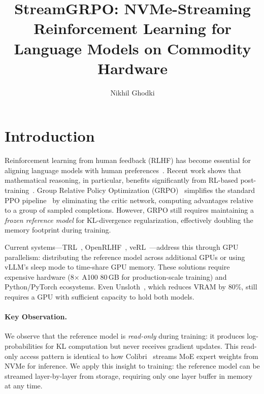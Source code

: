 \documentclass[sigconf,review,anonymous]{acmart}
\title{StreamGRPO: NVMe-Streaming Reinforcement Learning for Language Models on Commodity Hardware}
\author{Nikhil Ghodki}
\affiliation{%
  \institution{Cisco Systems}
  \city{San Jose}
  \state{CA}
  \country{USA}
}
\begin{document}
\maketitle

\section{Introduction}

Reinforcement learning from human feedback (RLHF) has become essential for aligning language models with human preferences~\cite{ouyang2022instructgpt}. Recent work shows that mathematical reasoning, in particular, benefits significantly from RL-based post-training~\cite{shao2024deepseekmath,guo2025deepseekr1}. Group Relative Policy Optimization (GRPO)~\cite{shao2024deepseekmath} simplifies the standard PPO pipeline~\cite{schulman2017ppo} by eliminating the critic network, computing advantages relative to a group of sampled completions. However, GRPO still requires maintaining a \emph{frozen reference model} for KL-divergence regularization, effectively doubling the memory footprint during training.

Current systems---TRL~\cite{trl2024}, OpenRLHF~\cite{hu2024openrlhf}, veRL~\cite{verl2025}---address this through GPU parallelism: distributing the reference model across additional GPUs or using vLLM's sleep mode to time-share GPU memory. These solutions require expensive hardware (8$\times$ A100 80\,GB for production-scale training) and Python/PyTorch ecosystems. Even Unsloth~\cite{unsloth2024}, which reduces VRAM by 80\%, still requires a GPU with sufficient capacity to hold both models.

\paragraph{Key Observation.} We observe that the reference model is \emph{read-only} during training: it produces log-probabilities for KL computation but never receives gradient updates. This read-only access pattern is identical to how Colibri~\cite{colibri2026} streams MoE expert weights from NVMe for inference. We apply this insight to training: the reference model can be streamed layer-by-layer from storage, requiring only one layer buffer in memory at any time.
\end{document}
